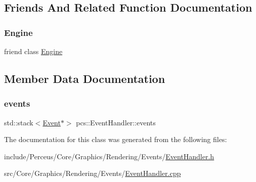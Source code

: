 \subsection{Friends And Related Function Documentation}
\mbox{\label{classpcs_1_1EventHandler_a3e1914489e4bed4f9f23cdeab34a43dc}} 
\subsubsection{\texorpdfstring{Engine}{Engine}}
{\footnotesize\ttfamily friend class \hyperlink{classpcs_1_1Engine}{Engine}\hspace{0.3cm}{\ttfamily [friend]}}



\subsection{Member Data Documentation}
\mbox{\label{classpcs_1_1EventHandler_a8f0c22c5705bafff72b96b4b5e32907a}} 
\subsubsection{\texorpdfstring{events}{events}}
{\footnotesize\ttfamily std\+::stack$<$\hyperlink{classpcs_1_1Event}{Event}$\ast$$>$ pcs\+::\+Event\+Handler\+::events\hspace{0.3cm}{\ttfamily [private]}}



The documentation for this class was generated from the following files\+:\begin{DoxyCompactItemize}
\item 
include/\+Perceus/\+Core/\+Graphics/\+Rendering/\+Events/\hyperlink{EventHandler_8h}{Event\+Handler.\+h}\item 
src/\+Core/\+Graphics/\+Rendering/\+Events/\hyperlink{EventHandler_8cpp}{Event\+Handler.\+cpp}\end{DoxyCompactItemize}
